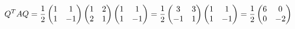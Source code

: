 \documentclass[preview]{standalone}
\begin{document}
\begin{align*}
\special{dvisvgm:raw <g id='unique000'>}Q^TAQ=\dfrac{1}{2}\begin{pmatrix}1&1\\1&-1\end{pmatrix}\begin{pmatrix}1&2\\2&1\end{pmatrix}\begin{pmatrix}1&1\\1&-1\end{pmatrix}=\dfrac{1}{2}\begin{pmatrix}3&3\\-1&1\end{pmatrix}\begin{pmatrix}1&1\\1&-1\end{pmatrix}=\dfrac{1}{2}\begin{pmatrix}6&0\\0&-2\end{pmatrix}\special{dvisvgm:raw </g>}
\end{align*}
\end{document}
